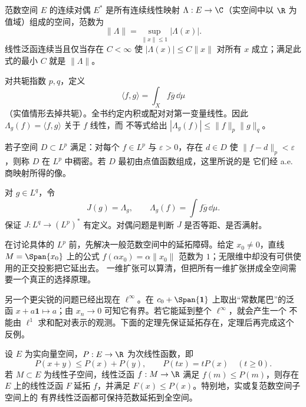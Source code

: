 \begin{definition}[连续对偶与对偶范数]\label{def:3-3-3-dual}
范数空间 $E$ 的连续对偶 $E^*$ 是所有连续线性映射
$\Lambda:E\to\C$（实空间中以 $\R$ 为值域）组成的空间，范数为
\[
  \|\Lambda\|=\sup_{\|x\|\le1}|\Lambda(x)|.
\]
线性泛函连续当且仅当存在 $C<\infty$ 使
$|\Lambda(x)|\le C\|x\|$ 对所有 $x$ 成立；满足此式的最小 $C$ 就是 $\|\Lambda\|$。
\end{definition}

\begin{definition}[积分配对]\label{def:3-3-3-1}
对共轭指数 $p,q$，定义
\[
  \langle f,g\rangle=\int_X f\overline g\,\dd\mu
\]
（实值情形去掉共轭）。全书约定内积或配对对第一变量线性。因此
$\Lambda_g(f)=\langle f,g\rangle$ 关于 $f$ 线性，而 \Holder{} 不等式给出
$|\Lambda_g(f)|\le\|f\|_p\|g\|_q$。
\end{definition}

\begin{definition}[测试类稠密]\label{def:3-3-3-2}
若子空间 $D\subset L^p$ 满足：对每个 $f\in L^p$ 与 $\varepsilon>0$，存在 $d\in D$ 使
$\|f-d\|_p<\varepsilon$，则称 $D$ 在 $L^p$ 中稠密。若 $D$ 最初由点值函数组成，这里所说的是
它们经 a.e. 商映射所得的像。
\end{definition}

\begin{definition}[对偶表示映射]\label{def:3-3-3-3}
对 $g\in L^q$，令
\[
  J(g)=\Lambda_g,
  \qquad \Lambda_g(f)=\int f\overline g\,\dd\mu.
\]
\Holder{} 保证 $J:L^q\to(L^p)^*$ 有定义。对偶问题是判断 $J$ 是否等距、是否满射。
\end{definition}

在讨论具体的 $L^p$ 前，先解决一般范数空间中的延拓障碍。给定 $x_0\ne0$，直线
$M=\Span\{x_0\}$ 上的公式
$f(\alpha x_0)=\alpha\|x_0\|$ 范数为 $1$；无限维中却没有可供使用的正交投影把它延出去。
一维扩张可以算清，但把所有一维扩张拼成全空间需要一个真正的选择原理。

另一个更尖锐的问题已经出现在 $\ell^\infty$。在
$c_0+\Span\{\mathbf1\}$ 上取出“常数尾巴”的泛函
$x+a\mathbf1\mapsto a$；由 $x_n\to0$ 可知它有界。若它能延到整个 $\ell^\infty$，就会产生一个
不能由 $\ell^1$ 求和配对表示的观测。下面的定理先保证延拓存在，定理后再完成这个反例。

\begin{theorem}\label{theorem:3-3-3-hahn-banach}
设 $E$ 为实向量空间，$P:E\to\R$ 为次线性函数，即
\[
 P(x+y)\le P(x)+P(y),
 \qquad P(tx)=tP(x)\quad(t\ge0).
\]
若 $M\subset E$ 为线性子空间，线性泛函 $f:M\to\R$ 满足 $f(m)\le P(m)$，则存在
$E$ 上的线性泛函 $F$ 延拓 $f$，并满足 $F(x)\le P(x)$。特别地，实或复范数空间子空间上的
有界线性泛函都可保持范数延拓到全空间。
\end{theorem}

